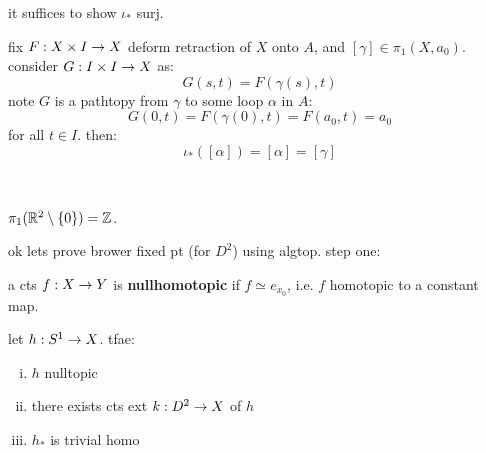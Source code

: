 \begin{pf}[source=Primary Source Material]
    it suffices to show $\iota_{*}$ surj.

    fix $F:X\times I\rightarrow X$ deform retraction of $X$ onto $A$, and $[\gamma]\in\pi_{1}(X,a_{0})$.
    consider $G:I\times I\rightarrow X$ as:
    \begin{equation*}
        G(s,t) = F(\gamma(s),t)
    \end{equation*}
    note $G$ is a pathtopy from $\gamma$ to some loop $\alpha$ in $A$:
    \begin{equation*}
        G(0,t)=F(\gamma(0),t)=F(a_{0},t)=a_{0}
    \end{equation*}
    for all $t\in I$. then:
    \begin{equation*}
        \iota_{*}([\alpha]) = [\alpha] = [\gamma]
    \end{equation*}
\end{pf} \

\begin{crll}
    $\pi_{1}(\mathbb{R}^{2}\setminus\left\{{0}\right\}) = \mathbb{Z}$.
\end{crll}

ok lets prove brower fixed pt (for $D^{2}$) using algtop.
step one:
\begin{defn}
    a cts $f:X\rightarrow Y$ is \textbf{nullhomotopic} if $f\simeq e_{x_{0}}$,
    i.e. $f$ homotopic to a constant map.
\end{defn}

\begin{prop}
    let $h:S^{1}\rightarrow X$. tfae: \vspace{-3mm}
    \begin{enumerate}[(i)]
        \item $h$ nulltopic
        \item there exists cts ext $k:D^{2}\rightarrow X$ of $h$
        \item $h_{*}$ is trivial homo
    \end{enumerate}
\end{prop} \

